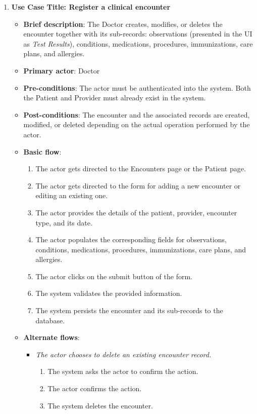 \begin{enumerate}
\item \textbf{Use Case Title: Register a clinical encounter}
\begin{itemize}
    \item \textbf{Brief description}: The Doctor creates, modifies, or deletes the encounter together with its sub-records: observations (presented in the UI as \emph{Test Results}), conditions, medications, procedures, immunizations, care plans, and allergies.
    \item \textbf{Primary actor}: Doctor
    \item \textbf{Pre-conditions}: The actor must be authenticated into the system. Both the Patient and Provider must already exist in the system.
    \item \textbf{Post-conditions}: The encounter and the associated records are created, modified, or deleted depending on the actual operation performed by the actor.
    \item \textbf{Basic flow}:
    \begin{enumerate}
        \item The actor gets directed to the Encounters page or the Patient page.
        \item The actor gets directed to the form for adding a new encounter or editing an existing one.
        \item The actor provides the details of the patient, provider, encounter type, and its date.
        \item The actor populates the corresponding fields for observations, conditions, medications, procedures, immunizations, care plans, and allergies.
        \item The actor clicks on the submit button of the form.
        \item The system validates the provided information.
        \item The system persists the encounter and its sub-records to the database.
    \end{enumerate}
    \item \textbf{Alternate flows}:
    \begin{itemize}
        \item[2a.] \textit{The actor chooses to delete an existing encounter record.}
        \begin{enumerate}
            \item The system asks the actor to confirm the action.
            \item The actor confirms the action.
            \item The system deletes the encounter.

\end{enumerate}
\end{itemize}
\end{itemize}
\end{enumerate}
